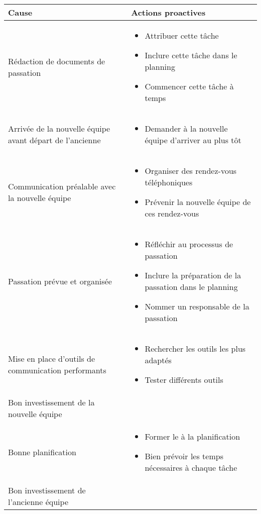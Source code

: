 {\centering
	\begin{longtable}{|p{7cm}|p{7cm}|}
	\hline
	\rowcolor{gray!40} Cause & Actions proactives \\
	\hline
	 Rédaction de documents de passation & \begin{itemize}
	 	\item Attribuer cette tâche
	 	\item Inclure cette tâche dans le planning
	 	\item Commencer cette tâche à temps
	 \end{itemize} \\
	\hline
	Arrivée de la nouvelle équipe avant départ de l'ancienne & \begin{itemize}
		\item Demander à la nouvelle équipe d'arriver au plus tôt
	\end{itemize} \\
	\hline
	Communication préalable avec la nouvelle équipe & \begin{itemize}
		\item Organiser des rendez-vous téléphoniques
		\item Prévenir la nouvelle équipe de ces rendez-vous
	\end{itemize} \\
	\hline
	Passation prévue et organisée & \begin{itemize}
		\item Réfléchir au processus de passation
		\item Inclure la préparation de la passation dans le planning
		\item Nommer un responsable de la passation
	\end{itemize} \\
	\hline
	Mise en place d'outils de communication performants & \begin{itemize}
		\item Rechercher les outils les plus adaptés
		\item Tester différents outils
	\end{itemize} \\
	\hline
	Bon investissement de la nouvelle équipe & 
	 \\
	\hline
	Bonne planification & \begin{itemize}
		\item Former le \CP à la planification
		\item Bien prévoir les temps nécessaires à chaque tâche
	\end{itemize} \\
	\hline
	Bon investissement de l'ancienne équipe & 
	 \\
	\hline

	\end{longtable}}


